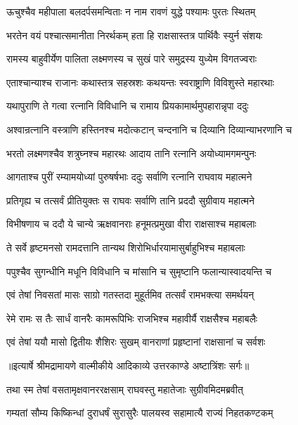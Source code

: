 \twolineshloka
{ऊचुश्चैव महीपाला बलदर्पसमन्विताः}
{न नाम रावणं युद्धे पश्यामः पुरतः स्थितम्} %

\twolineshloka
{भरतेन वयं पश्चात्समानीता निरर्थकम्}
{हता हि राक्षसास्तत्र पार्थिवैः स्युर्न संशयः} %

\twolineshloka
{रामस्य बाहुवीर्येण पालिता लक्ष्मणस्य च}
{सुखं पारे समुद्रस्य युध्येम विगतज्वराः} %

\twolineshloka
{एताश्चान्याश्च राजानः कथास्तत्र सहस्रशः}
{कथयन्तः स्वराष्ट्राणि विविशुस्ते महारथाः} %

\twolineshloka
{यथापुराणि ते गत्वा रत्नानि विविधानि च}
{रामाय प्रियकामार्थमुपहारान्नृपा ददुः} %

\twolineshloka
{अश्वान्रत्नानि वस्त्राणि हस्तिनश्च मदोत्कटान्}
{चन्दनानि च दिव्यानि दिव्यान्याभरणानि च} %

\twolineshloka
{भरतो लक्ष्मणश्चैव शत्रुघ्नश्च महारथः}
{आदाय तानि रत्नानि अयोध्यामगमन्पुनः} %

\twolineshloka
{आगताश्च पुरीं रम्यामयोध्यां पुरुषर्षभाः}
{ददुः सर्वाणि रत्नानि राघवाय महात्मने} %

\twolineshloka
{प्रतिगृह्य च तत्सर्वं प्रीतियुक्तः स राघवः}
{सर्वाणि तानि प्रददौ सुग्रीवाय महात्मने} %

\twolineshloka
{विभीषणाय च ददौ ये चान्ये ऋक्षवानराः}
{हनूमत्प्रमुखा वीरा राक्षसाश्च महाबलाः} %

\twolineshloka
{ते सर्वे हृष्टमनसो रामदत्तानि तान्यथ}
{शिरोभिर्धारयामासुर्बाहुभिश्च महाबलाः} %

\twolineshloka
{पपुश्चैव सुगन्धीनि मधूनि विविधानि च}
{मांसानि च सुमृष्टानि फलान्यास्वादयन्ति च} %

\twolineshloka
{एवं तेषां निवसतां मासः साग्रो गतस्तदा}
{मुहूर्तमिव तत्सर्वं रामभक्त्या समर्थयन्} %

\twolineshloka
{रेमे रामः स तैः सार्धं वानरैः कामरूपिभिः}
{राजभिश्च महावीर्यै राक्षसैश्च महाबलैः} %

\twolineshloka
{एवं तेषां ययौ मासो द्वितीयः शैशिरः सुखम्}
{वानराणां प्रहृष्टानां राक्षसानां च सर्वशः} %


{॥इत्यार्षे श्रीमद्रामायणे वाल्मीकीये आदिकाव्ये उत्तरकाण्डे अष्टात्रिंशः सर्गः॥}


\twolineshloka
{तथा स्म तेषां वसतामृक्षवानररक्षसाम्}
{राघवस्तु महातेजाः सुग्रीवमिदमब्रवीत्} %

\twolineshloka
{गम्यतां सौम्य किष्किन्धां दुराधर्षं सुरासुरैः}
{पालयस्व सहामात्यै राज्यं निहतकण्टकम्} %

